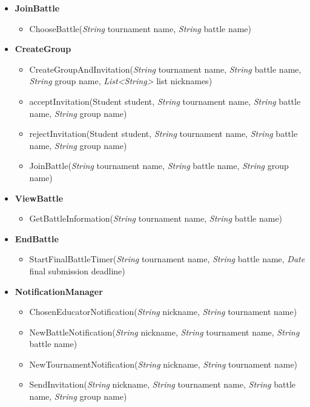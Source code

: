 \begin{itemize}
    \item \textbf{\textbf{JoinBattle}}
\begin{itemize}
    \item ChooseBattle(\textit{String} tournament name, \textit{String} battle name)
    \end{itemize}


    \item \textbf{\textbf{CreateGroup}}

\begin{itemize}
        \item CreateGroupAndInvitation(\textit{String} tournament name, \textit{String} battle name, \textit{String} group name, \textit{List\textless String\textgreater} list nicknames)
        \item acceptInvitation(Student student, \textit{String} tournament name, \textit{String} battle name, \textit{String} group name)
        \item rejectInvitation(Student student, \textit{String} tournament name, \textit{String} battle name, \textit{String} group name)
        \item JoinBattle(\textit{String} tournament name, \textit{String} battle name, \textit{String} group name)
\end{itemize}

    \item \textbf{\textbf{ViewBattle}}
    \begin{itemize}
        \item GetBattleInformation(\textit{String} tournament name, \textit{String} battle name)
\end{itemize}

    \item \textbf{\textbf{EndBattle}}
\begin{itemize}
        \item StartFinalBattleTimer(\textit{String} tournament name, \textit{String} battle name, \textit{Date} final submission deadline)
\end{itemize}

    \item \textbf{\textbf{NotificationManager}}

\begin{itemize}
        \item ChosenEducatorNotification(\textit{String} nickname, \textit{String} tournament name)
        \item NewBattleNotification(\textit{String} nickname, \textit{String} tournament name, \textit{String} battle name)
        \item NewTournamentNotification(\textit{String} nickname, \textit{String} tournament name)
        \item SendInvitation(\textit{String} nickname, \textit{String} tournament name, \textit{String} battle name, \textit{String} group name)
\end{itemize}


\end{itemize}
